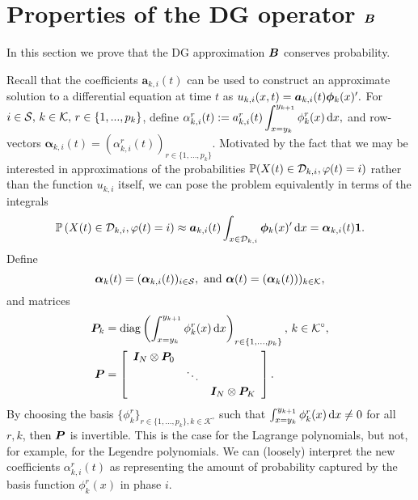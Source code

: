 \chapter{Properties of the DG operator \(\boldsymbol B\)\label{sec:properties}}
In this section we prove that the DG approximation \(\boldsymbol B\) conserves probability. 

Recall that the coefficients \({\boldsymbol a}_{k,i}(t)\) can be used to construct an approximate solution to a differential equation at time \(t\) as \(u_{k,i}(x,t)={\boldsymbol a}_{k,i}(t)\boldsymbol \phi_k(x)'{}.\) For \(i\in\mathcal{S},\,k\in\mathcal K,\,r\in\{1,...,p_k\}\), define \(\alpha_{k,i}^r(t) := a_{k,i}^r(t)\displaystyle\int_{x=y_k}^{y_{k+1}}\phi^r_k(x)\, \mathrm{d} x,\) and row-vectors \(\boldsymbol \alpha_{k,i}(t)=(\alpha_{k,i}^r(t))_{r\in\{1,...,p_k\}}\). Motivated by the fact that we may be interested in approximations of the probabilities \(\mathbb P(X(t)\in\mathcal{D}_{k,i},\varphi(t)=i)\) rather than the function \(u_{k,i}\) itself, we can pose the problem equivalently in terms of the integrals 
\[\mathbb P\left(X(t)\in\mathcal{D}_{k,i},\varphi(t)=i\right)\approx{\boldsymbol a}_{k,i}(t)\int_{x\in\mathcal{D}_{k,i}}\boldsymbol \phi_k(x)'{}\, \mathrm{d} x={\boldsymbol \alpha}_{k,i}(t)\boldsymbol 1.\] 
Define
\[\boldsymbol \alpha_k(t) = (\boldsymbol \alpha_{k,i}(t))_{i\in\mathcal{S}},\mbox{ and } \boldsymbol \alpha(t)=(\boldsymbol \alpha_k(t)))_{k\in\mathcal K},\]
and matrices 
\begin{align*}
\boldsymbol P_k &= \mathrm{diag}\left(\int_{x=y_k}^{y_{k+1}}\phi^r_k(x)\, \mathrm{d} x\right)_{ r\in\{1,...,p_k\}},\, k\in\mathcal K^\circ,
\\\boldsymbol P &=\left[\begin{array}{ccc}
		\boldsymbol I_{N}\otimes \boldsymbol P_0 & &\\
		& \ddots &\\
		& & \boldsymbol I_{N}\otimes \boldsymbol P_K
	\end{array}\right].
\end{align*}
By choosing the basis \(\{\phi_{k}^r\}_{r\in\{1,...,p_k\},k\in\mathcal K^\circ}\) such that \(\int_{x=y_k}^{y_{k+1}}\phi^r_k(x)\, \mathrm{d} x\neq 0\) for all \(r,k\), then \(\boldsymbol P\) is invertible. This is the case for the Lagrange polynomials, but not, for example, for the Legendre polynomials. We can (loosely) interpret the new coefficients \(\alpha_{k,i}^r(t)\) as representing the amount of probability captured by the basis function \(\phi^r_k(x)\) in phase \(i\).

